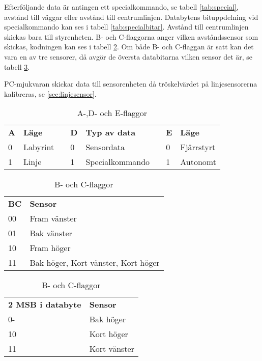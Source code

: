 Efterföljande data är antingen ett specialkommando,
se tabell \ref{tab:special}, avstånd till väggar eller avstånd till 
centrumlinjen. Databytens bituppdelning vid specialkommando kan ses i tabell
\ref{tab:specialbitar}. Avstånd till centrumlinjen skickas bara till styrenheten.
B- och C-flaggorna anger vilken avståndssensor som skickas, kodningen kan ses i
tabell \ref{tab:bcflaggor}. Om både B- och C-flaggan är satt kan det vara en av
tre sensorer, då avgör de översta databitarna vilken sensor det är, se tabell
\ref{tab:kortsensor}.

PC-mjukvaran skickar data till sensorenheten då tröskelvärdet på linjesensorerna
kalibreras, se \ref{sec:linjesensor}.

\begin{table}[H]
  \centering
  \begin{tabular}{l l l l l l l l}
    \textbf{A} & \textbf{Läge} & & \textbf{D} & \textbf{Typ av data} & & \textbf{E} & \textbf{Läge} \\
    0 & Labyrint & & 0 & Sensordata & & 0 & Fjärrstyrt \\
    1 & Linje & & 1 & Specialkommando & & 1 & Autonomt \\
  \end{tabular}
  \caption{A-,D- och E-flaggor}
  \label{tab:adeflaggor}
\end{table}


\begin{table}[H]
  \centering
  \begin{tabular}{l l}
    \textbf{BC} & \textbf{Sensor} \\
    00 & Fram vänster \\
    01 & Bak vänster \\
    10 & Fram höger\\
    11 & Bak höger, Kort vänster, Kort höger\\
  \end{tabular}
  \caption{B- och C-flaggor}
  \label{tab:bcflaggor}
\end{table}


\begin{table}[H]
  \centering
  \begin{tabular}{l l}
    \textbf{2 MSB i databyte} & \textbf{Sensor} \\
    0- & Bak höger \\
    10 & Kort höger \\
    11 & Kort vänster\\
  \end{tabular}
  \caption{B- och C-flaggor}
  \label{tab:kortsensor}
\end{table}

